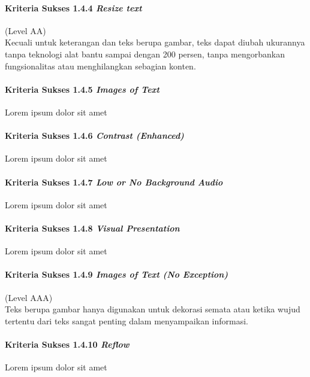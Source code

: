 \paragraph{Kriteria Sukses 1.4.4 \textit{Resize text}}
\label{sec:kriteria_sukses_1.4.4}
(Level AA)\\

Kecuali untuk keterangan dan teks berupa gambar, teks dapat diubah ukurannya tanpa teknologi alat bantu sampai dengan 200 persen, tanpa mengorbankan fungsionalitas atau menghilangkan sebagian konten.

\paragraph{Kriteria Sukses 1.4.5 \textit{Images of Text}}
\label{sec:kriteria_sukses_1.4.5}
Lorem ipsum dolor sit amet

\paragraph{Kriteria Sukses 1.4.6 \textit{Contrast (Enhanced)}}
\label{sec:kriteria_sukses_1.4.6}
Lorem ipsum dolor sit amet

\paragraph{Kriteria Sukses 1.4.7 \textit{Low or No Background Audio}}
\label{sec:kriteria_sukses_1.4.7}
Lorem ipsum dolor sit amet

\paragraph{Kriteria Sukses 1.4.8 \textit{Visual Presentation}}
\label{sec:kriteria_sukses_1.4.8}
Lorem ipsum dolor sit amet

\paragraph{Kriteria Sukses 1.4.9 \textit{Images of Text (No Exception)}}
\label{sec:kriteria_sukses_1.4.9}
(Level AAA)\\

Teks berupa gambar hanya digunakan untuk dekorasi semata atau ketika wujud tertentu dari teks sangat penting dalam menyampaikan informasi.

\paragraph{Kriteria Sukses 1.4.10 \textit{Reflow}}
\label{sec:kriteria_sukses_1.4.10}
Lorem ipsum dolor sit amet

